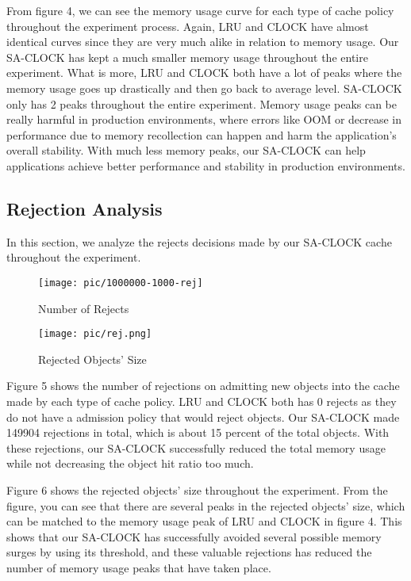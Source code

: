 \documentclass[journal,10.5pt,onecolumn]{IEEEtran}
\begin{document}
From figure 4, we can see the memory usage curve for each type of cache policy throughout the experiment process. Again, LRU and CLOCK have almost identical curves since they are very much alike in relation to memory usage. Our SA-CLOCK has kept a much smaller memory usage throughout the entire experiment. What is more, LRU and CLOCK both have a lot of peaks where the memory usage goes up drastically and then go back to average level. SA-CLOCK only has 2 peaks throughout the entire experiment. Memory usage peaks can be really harmful in production environments, where errors like OOM or decrease in performance due to memory recollection can happen and harm the application's overall stability. With much less memory peaks, our SA-CLOCK can help applications achieve better performance and stability in production environments.



\subsection{Rejection Analysis}
In this section, we analyze the rejects decisions made by our SA-CLOCK cache throughout the experiment. 

\begin{figure}[h]
\centerline{\texttt{[image: pic/1000000-1000-rej]}}
\caption{Number of Rejects}
\label{fig}
\end{figure}


\begin{figure}[h]
\centerline{\texttt{[image: pic/rej.png]}}
\caption{Rejected Objects' Size}
\label{fig}
\end{figure}

Figure 5 shows the number of rejections on admitting new objects into the cache made by each type of cache policy. LRU and CLOCK both has 0 rejects as they do not have a admission policy that would reject objects. Our SA-CLOCK made 149904 rejections in total, which is about 15 percent of the total objects. With these rejections, our SA-CLOCK successfully reduced the total memory usage while not decreasing the object hit ratio too much.

Figure 6 shows the rejected objects' size throughout the experiment. From the figure, you can see that there are several peaks in the rejected objects' size, which can be matched to the memory usage peak of LRU and CLOCK in figure 4. This shows that our SA-CLOCK has successfully avoided several possible memory surges by using its threshold, and these valuable rejections has reduced the number of memory usage peaks that have taken place. 
\end{document}
